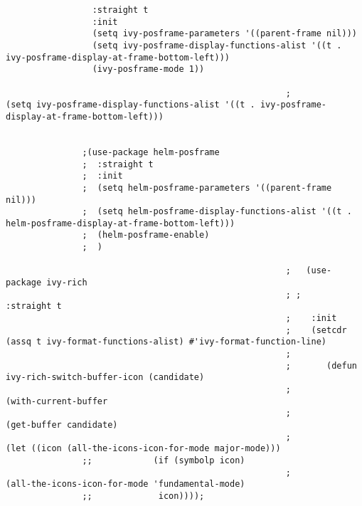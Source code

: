\documentclass[11pt]{article}
\begin{document}
\begin{verbatim}
                 :straight t
                 :init   
                 (setq ivy-posframe-parameters '((parent-frame nil)))
                 (setq ivy-posframe-display-functions-alist '((t . ivy-posframe-display-at-frame-bottom-left)))
                 (ivy-posframe-mode 1))

                                                       ;               (setq ivy-posframe-display-functions-alist '((t . ivy-posframe-display-at-frame-bottom-left)))


               ;(use-package helm-posframe
               ;  :straight t
               ;  :init
               ;  (setq helm-posframe-parameters '((parent-frame nil)))
               ;  (setq helm-posframe-display-functions-alist '((t . helm-posframe-display-at-frame-bottom-left)))
               ;  (helm-posframe-enable)
               ;  )

                                                       ;   (use-package ivy-rich
                                                       ; ;    :straight t
                                                       ;    :init   
                                                       ;    (setcdr (assq t ivy-format-functions-alist) #'ivy-format-function-line)
                                                       ;
                                                       ;       (defun ivy-rich-switch-buffer-icon (candidate)
                                                       ;         (with-current-buffer
                                                       ;             (get-buffer candidate)
                                                       ;           (let ((icon (all-the-icons-icon-for-mode major-mode)))
               ;;            (if (symbolp icon)
                                                       ;                (all-the-icons-icon-for-mode 'fundamental-mode)
               ;;             icon))));


\end{verbatim}
\end{document}
